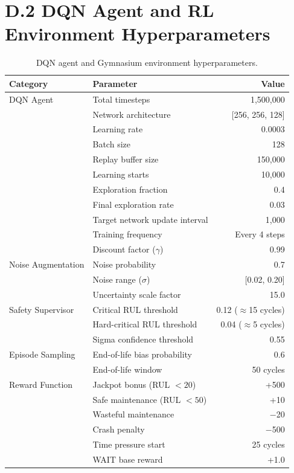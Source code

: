 \documentclass[12pt,a4paper]{report}
\begin{document}
\section*{D.2 DQN Agent and RL Environment Hyperparameters}

\begin{table}[h]
\centering
\caption{DQN agent and Gymnasium environment hyperparameters.}
\label{tab:app_rl_params}
\begin{tabular}{llr}
\toprule
\textbf{Category} & \textbf{Parameter} & \textbf{Value} \\
\midrule
DQN Agent & Total timesteps & 1,500,000 \\
 & Network architecture & [256, 256, 128] \\
 & Learning rate & 0.0003 \\
 & Batch size & 128 \\
 & Replay buffer size & 150,000 \\
 & Learning starts & 10,000 \\
 & Exploration fraction & 0.4 \\
 & Final exploration rate & 0.03 \\
 & Target network update interval & 1,000 \\
 & Training frequency & Every 4 steps \\
 & Discount factor ($\gamma$) & 0.99 \\
\midrule
Noise Augmentation & Noise probability & 0.7 \\
 & Noise range ($\sigma$) & [0.02, 0.20] \\
 & Uncertainty scale factor & 15.0 \\
\midrule
Safety Supervisor & Critical RUL threshold & 0.12 ($\approx$15 cycles) \\
 & Hard-critical RUL threshold & 0.04 ($\approx$5 cycles) \\
 & Sigma confidence threshold & 0.55 \\
\midrule
Episode Sampling & End-of-life bias probability & 0.6 \\
 & End-of-life window & 50 cycles \\
\midrule
Reward Function & Jackpot bonus (RUL $< 20$) & +500 \\
 & Safe maintenance (RUL $< 50$) & +10 \\
 & Wasteful maintenance & $-$20 \\
 & Crash penalty & $-$500 \\
 & Time pressure start & 25 cycles \\
 & WAIT base reward & +1.0 \\
\bottomrule
\end{tabular}
\end{table}
\end{document}
